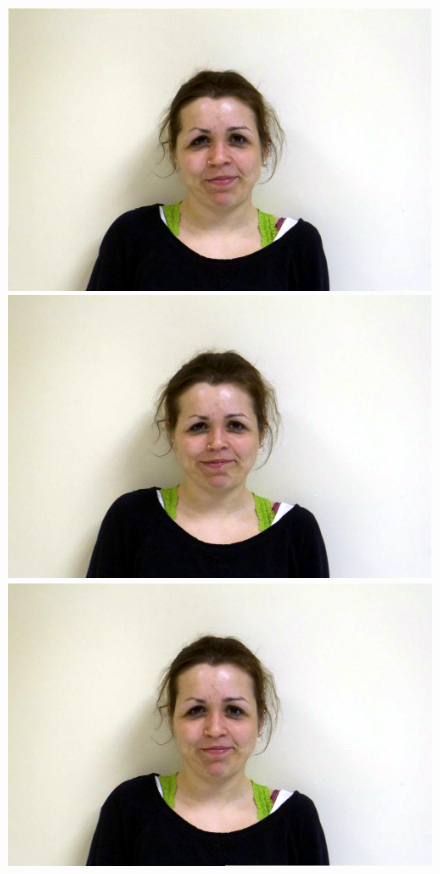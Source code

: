 \documentclass[11pt]{article}
\begin{document}
\begin{figure}[H]
\begin{center}
\includegraphics[scale=0.17]{figs/caricatures/fun_11.jpg}  
\includegraphics[scale=0.17]{figs/caricatures/fun_12.jpg}  
\includegraphics[scale=0.17]{figs/caricatures/fun_13.jpg}  

\end{center}
\end{figure}
\end{document}
